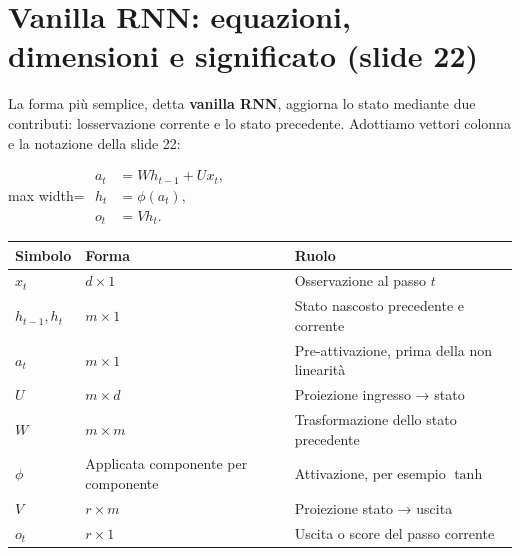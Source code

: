 \documentclass[11pt,a4paper,oneside,openany]{book}
\begin{document}
\section{Vanilla RNN: equazioni, dimensioni e significato (slide 22)}\label{f03-r248}

La forma più semplice, detta \textbf{vanilla RNN}, aggiorna lo stato mediante due contributi: l\textquotesingle osservazione corrente e lo stato precedente. Adottiamo vettori colonna e la notazione della slide 22:

\begin{center}
\begin{adjustbox}{max width=\linewidth}
$\displaystyle \boxed{\begin{aligned}
a_t&=Wh_{t-1}+Ux_t,\\
h_t&=\phi(a_t),\\
o_t&=Vh_t.
\end{aligned}}$
\end{adjustbox}
\end{center}

\begin{longtable}[]{@{}
  >{\raggedright\arraybackslash}p{}
  >{\raggedright\arraybackslash}p{}
  >{\raggedright\arraybackslash}p{}@{}}
\toprule\noalign{}
\begin{minipage}[b]{\linewidth}\raggedright
Simbolo
\end{minipage} & \begin{minipage}[b]{\linewidth}\raggedright
Forma
\end{minipage} & \begin{minipage}[b]{\linewidth}\raggedright
Ruolo
\end{minipage} \\
\midrule\noalign{}
\endhead
\bottomrule\noalign{}
\endlastfoot
\(x_t\) & \(d\times1\) & Osservazione al passo \(t\) \\
\(h_{t-1},h_t\) & \(m\times1\) & Stato nascosto precedente e corrente \\
\(a_t\) & \(m\times1\) & Pre-attivazione, prima della non linearità \\
\(U\) & \(m\times d\) & Proiezione ingresso → stato \\
\(W\) & \(m\times m\) & Trasformazione dello stato precedente \\
\(\phi\) & Applicata componente per componente & Attivazione, per esempio \(\tanh\) \\
\(V\) & \(r\times m\) & Proiezione stato → uscita \\
\(o_t\) & \(r\times1\) & Uscita o score del passo corrente \\
\end{longtable}
\end{document}
